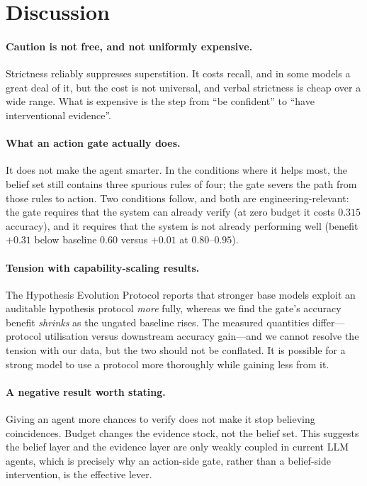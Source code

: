 \documentclass[11pt]{article}
\begin{document}
\section{Discussion}\label{sec:discussion}

\paragraph{Caution is not free, and not uniformly expensive.} Strictness reliably suppresses
superstition. It costs recall, and in some models a great deal of it, but the cost is not
universal, and verbal strictness is cheap over a wide range. What is expensive is the step
from ``be confident'' to ``have interventional evidence''.

\paragraph{What an action gate actually does.} It does not make the agent smarter. In the
conditions where it helps most, the belief set still contains three spurious rules of four;
the gate severs the path from those rules to action. Two conditions follow, and both are
engineering-relevant: the gate requires that the system can already verify (at zero budget
it costs $0.315$ accuracy), and it requires that the system is not already performing well
(benefit $+0.31$ below baseline $0.60$ versus $+0.01$ at $0.80$--$0.95$).

\paragraph{Tension with capability-scaling results.} The Hypothesis Evolution Protocol
\citep{hep} reports that stronger base models exploit an auditable hypothesis protocol
\emph{more} fully, whereas we find the gate's
accuracy benefit \emph{shrinks} as the ungated baseline rises. The measured quantities
differ---protocol utilisation versus downstream accuracy gain---and we cannot resolve the
tension with our data, but the two should not be conflated. It is possible for a strong model
to use a protocol more thoroughly while gaining less from it.

\paragraph{A negative result worth stating.} Giving an agent more chances to verify does not
make it stop believing coincidences. Budget changes the evidence stock, not the belief set.
This suggests the belief layer and the evidence layer are only weakly coupled in current
LLM agents, which is precisely why an action-side gate, rather than a belief-side
intervention, is the effective lever.
\end{document}
